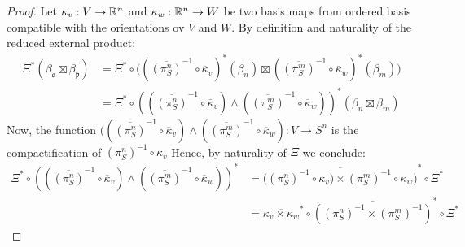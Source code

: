 \begin{proof} Let $\kappa_v:V \to \mathbb{R}^n$ and $\kappa_w:\mathbb{R}^n \to W$ be two basis maps from ordered basis compatible with the orientations ov $V$ and $W$.
    By definition and naturality of the reduced external product:
    \begin{align*}
         \Xi^{*}\left(\beta_{\mathfrak o}\boxtimes\beta_{\mathfrak p}\right)
         &= \Xi^* \circ \Big(\left(\overline{(\pi_S^n)}^{-1}\circ \overline{\kappa}_v\right)^*(\beta_n) \boxtimes \left(\overline{(\pi_S^m)}^{-1}\circ \overline{\kappa}_w\right)^*(\beta_m) \Big) \\
         &= \Xi^* \circ \left(\left(\overline{(\pi_S^n)}^{-1}\circ \overline{\kappa}_v\right) \wedge \left(\overline{(\pi_S^m)}^{-1}\circ \overline{\kappa}_w\right)\right)^*(\beta_n \boxtimes \beta_m)
    \end{align*}
Now, the function $(\left(\overline{(\pi_S^n)}^{-1}\circ \overline{\kappa}_v\right) \wedge \left(\overline{(\pi_S^m)}^{-1}\circ \overline{\kappa}_w\right):\overline{V}\to S^n$ is the compactification of $(\pi_S^n)^{-1}\circ \kappa_v$ Hence, by naturality of $\Xi$ we conclude:
\begin{align*}
    \Xi^* \circ \left(\left(\overline{(\pi_S^n)}^{-1}\circ \overline{\kappa}_v\right) \wedge \left(\overline{(\pi_S^m)}^{-1}\circ \overline{\kappa}_w\right)\right)^*
    &= \overline{
        \big((\pi_S^n)^{-1}\circ \kappa_v\big)\times (\pi_S^m)^{-1}\circ \kappa_w \big)
    }^* \circ \Xi^* \\
    &=\overline{\kappa_v\times \kappa_w}^*\circ \overline{\left((\pi_S^n)^{-1} \times (\pi_S^m)^{-1}\right)}^*\circ \Xi^*
\end{align*}



\end{proof}
